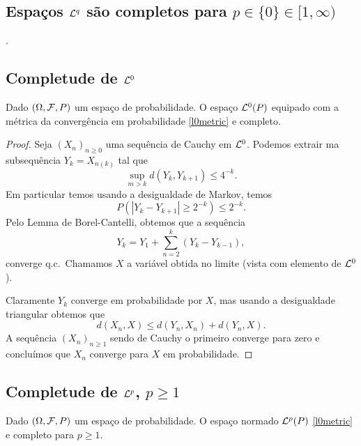 \begin{topics}
\section{Espaços ${\mathcal L}^q$ são completos para $p\in \{0\}\in [1,\infty)$}.


\subsection{Completude de ${\mathcal L}^0$}

\begin{theorem}
Dado $(\Omega,{\mathcal F},P)$ um espaço de probabilidade. 
O espaço ${\mathcal L}^0(P)$ equipado com a métrica  da convergência em probabilidade \eqref{l0metric} e completo. 
 
\end{theorem}


\begin{proof}


Seja $(X_n)_{n\ge 0}$ uma sequência de Cauchy em ${\mathcal L}^0$. 
Podemos extrair ma subsequência $Y_k=X_{n(k)}$ tal que 
\begin{equation}
\sup_{m>k} d(Y_k,Y_{k+1})\le  4^{-k}.
\end{equation}
Em particular temos usando a desigualdade de Markov, temos
\begin{equation}
P(|Y_k-Y_{k+1}|\ge 2^{-k})\le 2^{-k}.
\end{equation}
Pelo Lemma de Borel-Cantelli, obtemos que a sequência 
$$Y_k=Y_1+\sum_{n=2}^k (Y_k-Y_{k-1}),$$
 converge q.c.\ Chamamos $X$ a variável obtida no limite (vista com elemento de ${\mathcal L}^0$).
 
 \medskip
 
 Claramente $Y_k$ converge em probabilidade por $X$, mas usando a desigualdade triangular obtemos que 
 $$d(X_n,X)\le d(Y_{n},X_n)+d(Y_n,X).$$
 A sequência $(X_n)_{n\ge 1}$ sendo de Cauchy o primeiro converge para zero e concluímos que 
 $X_n$ converge para $X$ em probabilidade.
\end{proof}

\subsection{Completude de ${\mathcal L}^p$, $p\ge 1$}
 
 
 \begin{theorem}
Dado $(\Omega,{\mathcal F},P)$ um espaço de probabilidade. 
O espaço normado ${\mathcal L}^p(P)$ \eqref{l0metric} e completo para $p\ge 1$. 
 

\end{theorem}
\end{topics}
